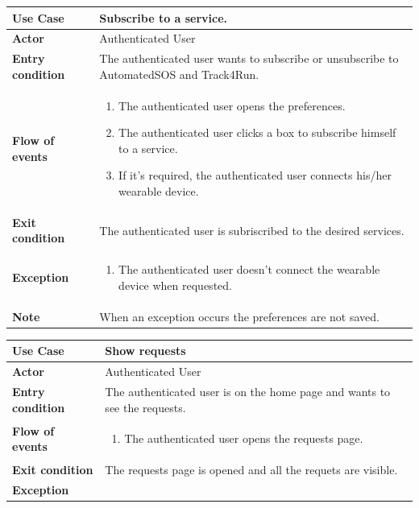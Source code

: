 \documentclass[../main.tex]{subfiles}
\begin{document}
	\vspace*{3cm}
	\begin{center}
		\begin{tabular}{p{3cm}p{8.28cm}}
			\hline
			\textbf{Use Case} & Subscribe to a service.\\
			\hline
			\textbf{Actor} & Authenticated User\\
			\hline
			\textbf{Entry condition} & The authenticated user wants to subscribe or unsubscribe to AutomatedSOS and Track4Run.\\
			\hline
			\textbf{Flow of events} & \begin{enumerate}
				\linespread{0}\item The authenticated user opens the preferences.
				\linespread{0}\item The authenticated user clicks a box to subscribe himself to a service.
				\linespread{0}\item If it's required, the authenticated user connects his/her wearable device.
			\end{enumerate}\\
			\hline
			\textbf{Exit condition} & The authenticated user is subriscribed to the desired services.\\
			\hline
			\textbf{Exception} & \begin{enumerate}
				\linespread{0}\item The authenticated user doesn't connect the wearable device when requested.
			\end{enumerate}\\
			\hline
			\textbf{Note} & When an exception occurs the preferences are not saved.\\
			\hline
		\end{tabular}
	\end{center}
	\vspace*{3cm}
	\begin{center}
		\begin{tabular}{p{3cm}p{8.28cm}}
			\hline
			\textbf{Use Case} & Show requests\\
			\hline
			\textbf{Actor} & Authenticated User\\
			\hline
			\textbf{Entry condition} & The authenticated user is on the home page and wants to see the requests.\\
			\hline
			\textbf{Flow of events} & \begin{enumerate}
				\linespread{0}\item The authenticated user opens the requests page.
			\end{enumerate}\\
			\hline
			\textbf{Exit condition} & The requests page is opened and all the requets are visible.\\
			\hline
			\textbf{Exception}\\
			\hline
		\end{tabular}
	\end{center}
\end{document}
